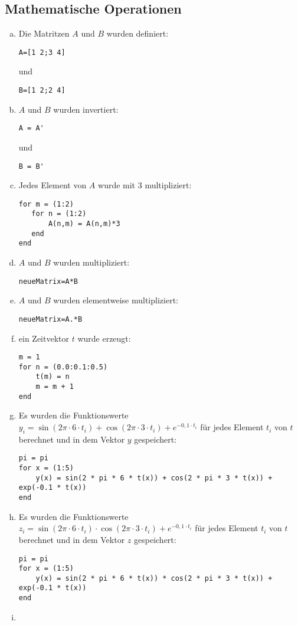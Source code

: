 \subsection{Mathematische Operationen}

\begin{enumerate}[a)]
    \item Die Matritzen $A$ und $B$ wurden definiert:
    \begin{verbatim}A=[1 2;3 4]\end{verbatim}
    und
    \begin{verbatim}B=[1 2;2 4]\end{verbatim}
    
    \item $A$ und $B$ wurden invertiert:
    \begin{verbatim}A = A'\end{verbatim}
    und
    \begin{verbatim}B = B'\end{verbatim}

    \item Jedes Element von $A$ wurde mit $3$ multipliziert:
    \begin{verbatim}
for m = (1:2)
   for n = (1:2)
       A(n,m) = A(n,m)*3
   end
end
    \end{verbatim}
    
    \item $A$ und $B$ wurden multipliziert:
    \begin{verbatim}neueMatrix=A*B\end{verbatim}
    
    \item $A$ und $B$ wurden elementweise multipliziert:
    \begin{verbatim}neueMatrix=A.*B\end{verbatim}

    \item ein Zeitvektor $t$ wurde erzeugt:
    \begin{verbatim}
m = 1
for n = (0.0:0.1:0.5)
    t(m) = n
    m = m + 1
end
    \end{verbatim}

    \item Es wurden die Funktionswerte $y_i = \sin{(2\pi \cdot 6 \cdot t_i)} + \cos{(2\pi \cdot 3 \cdot t_i)} + e^{-0,1 \cdot t_i}$ für jedes Element $t_i$ von $t$ berechnet und in dem Vektor $y$ gespeichert:
    \begin{verbatim}
pi = pi
for x = (1:5)
    y(x) = sin(2 * pi * 6 * t(x)) + cos(2 * pi * 3 * t(x)) + exp(-0.1 * t(x))
end
    \end{verbatim}

    \item Es wurden die Funktionswerte $z_i = \sin{(2\pi \cdot 6 \cdot t_i)} \cdot \cos{(2\pi \cdot 3 \cdot t_i)} + e^{-0,1 \cdot t_i}$ für jedes Element $t_i$ von $t$ berechnet und in dem Vektor $z$ gespeichert:
    \begin{verbatim}
pi = pi
for x = (1:5)
    y(x) = sin(2 * pi * 6 * t(x)) * cos(2 * pi * 3 * t(x)) + exp(-0.1 * t(x))
end
    \end{verbatim}

    \item 
\end{enumerate}